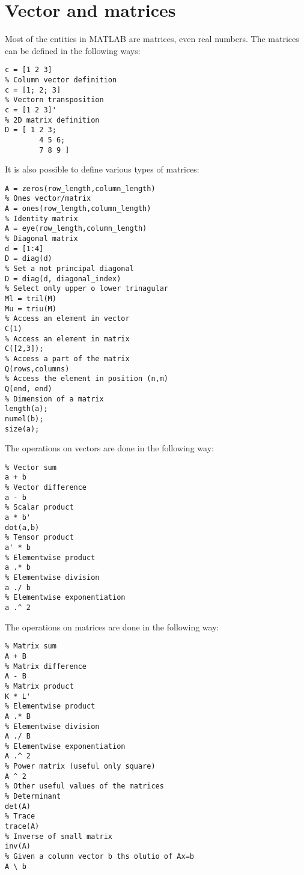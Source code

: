 \documentclass[12pt, a4paper]{report}
\newtheorem[style=M,bodystyle=\normalfont]{theorem}{Theorem}
\newtheorem[style=M,bodystyle=\normalfont]{corollary}{Corollary}
\newtheorem[style=M,bodystyle=\normalfont]{lemma}{Lemma}
\newtheorem[style=M,bodystyle=\normalfont]{definition}{Definition}
\begin{document}
    \section{Vector and matrices}
    Most of the entities in MATLAB are matrices, even real numbers. The matrices can be defined in the following ways: 
    \begin{lstlisting}[frame=single, numbers=none, style=Matlab-bw]
% Row vector definition
c = [1 2 3]
% Column vector definition
c = [1; 2; 3]
% Vectorn transposition
c = [1 2 3]'
% 2D matrix definition
D = [ 1 2 3; 
        4 5 6; 
        7 8 9 ]
    \end{lstlisting}
    It is also possible to define various types of matrices: 
    \begin{lstlisting}[frame=single, numbers=none, style=Matlab-bw]
% Zeros vector/matrix
A = zeros(row_length,column_length)	
% Ones vector/matrix
A = ones(row_length,column_length)	
% Identity matrix
A = eye(row_length,column_length)   
% Diagonal matrix
d = [1:4]
D = diag(d)
% Set a not principal diagonal 
D = diag(d, diagonal_index)
% Select only upper o lower trinagular
Ml = tril(M)
Mu = triu(M)
% Access an element in vector
C(1)
% Access an element in matrix
C([2,3]);
% Access a part of the matrix
Q(rows,columns)    
% Access the element in position (n,m)
Q(end, end)   
% Dimension of a matrix
length(a);
numel(b);
size(a);
    \end{lstlisting}  
    The operations on vectors are done in the following way: 
    \begin{lstlisting}[frame=single, numbers=none, style=Matlab-bw]
% Given two row vectors a and b
% Vector sum
a + b    
% Vector difference
a - b   
% Scalar product
a * b'      
dot(a,b)   
% Tensor product
a' * b      
% Elementwise product
a .* b  
% Elementwise division    
a ./ b  
% Elementwise exponentiation    
a .^ 2      
    \end{lstlisting}  
    The operations on matrices are done in the following way: 
    \begin{lstlisting}[frame=single, numbers=none, style=Matlab-bw]
% Givcen two matrices A and B (both 3x2)
% Matrix sum
A + B
% Matrix difference
A - B
% Matrix product
K * L'
% Elementwise product
A .* B
% Elementwise division
A ./ B      
% Elementwise exponentiation
A .^ 2      
% Power matrix (useful only square)
A ^ 2         
% Other useful values of the matrices
% Determinant
det(A)
% Trace
trace(A)  
% Inverse of small matrix      
inv(A)          
% Given a column vector b ths olutio of Ax=b
A \ b       
    \end{lstlisting}  
\end{document}

